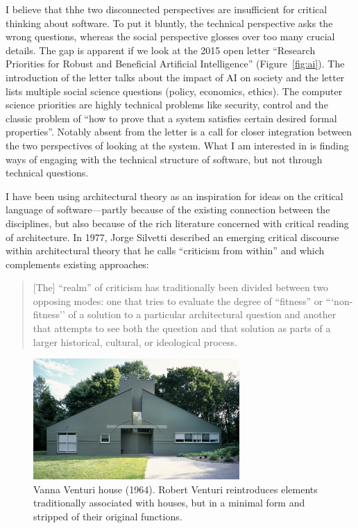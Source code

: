 I believe that thhe two disconnected perspectives are insufficient for critical thinking about
software. To put it bluntly, the technical perspective asks the wrong questions, whereas the social
perspective glosses over too many crucial details. The gap is apparent if we look at the
2015 open letter ``Research Priorities for Robust and Beneficial Artificial
Intelligence'' (Figure~\ref{fig:ai}). The introduction of the letter talks
about the impact of AI on society and the letter lists multiple social science questions (policy,
economics, ethics). The computer science priorities are highly technical problems like security,
control and the classic problem of ``how to prove that a system satisfies certain desired formal
properties''. Notably absent from the letter is a call for closer integration between the
two perspectives of looking at the system. What I am interested in is finding ways
of engaging with the technical structure of software, but not through technical questions.

I have been using architectural theory as an inspiration for ideas on the critical language
of software---partly because of the existing connection between the disciplines, but also
because of the rich literature concerned with critical reading of architecture.
In 1977, Jorge Silvetti described an emerging critical discourse within architectural theory that
he calls ``criticism from within'' and which complements existing
approaches:

\begin{quote}
[The] ``realm'' of criticism has traditionally been divided between two opposing modes: one
that tries to evaluate the degree of ``fitness'' or ```non-fitness'' of a solution
to a particular architectural question and another that attempts to see both the question and
that solution as parts of a larger historical, cultural, or ideological process.
\end{quote}

\begin{figure}
\centering
\vspace{-1em}
\includegraphics[width=0.7\textwidth]{fig/venturi.jpg}
\caption{Vanna Venturi house (1964). Robert Venturi reintroduces elements traditionally associated
with houses, but in a minimal form and stripped of their original functions.}
\label{fig:vanna}
\end{figure}

